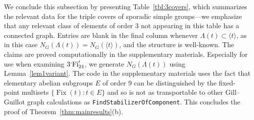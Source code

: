 \documentclass[11pt,a4paper]{amsart}
\theoremstyle{plain}
\theoremstyle{definition}
\theoremstyle{remark}
\newcounter{claim}[definition]
\theoremstyle{remark}
\theoremstyle{remark}
\theoremstyle{definition}
\newcommand{\ns}{\mathbin{\mspace{-4mu}\vcenter{\hbox{\raisebox{1ex}{$\cdot$}}}\mspace{-4mu}}}
\DeclareMathOperator{\Fix}{Fix}
\DeclareMathOperator{\Fi}{Fi}
\begin{document}
We conclude this subsection by presenting Table~\ref{tbl:3covers}, which summarizes the relevant data for the triple covers of sporadic simple groups---we emphasize that any relevant class of elements of order 3 not appearing in this table has a connected graph. Entries are blank in the final column whenever $\Lambda(t)\subset \langle t\rangle$, as in this case $N_G(\Lambda(t))=N_G(\langle t\rangle)$, and the structure is well-known. The claims are proved computationally in the supplementary materials. Especially for use when examining $3\ns\Fi_{24}'$, we generate $N_G(\Lambda(t))$ using Lemma~\ref{lem1variant}. The code in the supplementary materials uses the fact that elementary abelian subgroups $E$ of order $9$ can be distinguished by the fixed-point multisets $\{\Fix(t): t \in E\}$ and so is not as transportable to other Gill--Guillot graph calculations as \texttt{FindStabilizerOfComponent}. This concludes the proof of Theorem~\ref{thm:mainresults}(b).
\end{document}
